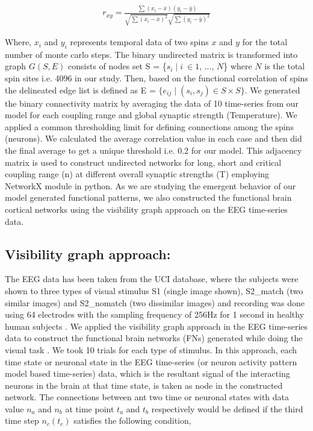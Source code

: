 \documentclass[preprintnumbers,amsmath,amssymb,onecolumn]{revtex4}
\begin{document}
\begin{eqnarray}
r_{xy}=\frac{\sum(x_{i}-\bar{x})(y_{i}-\bar{y})}{\sqrt{\sum(x_{i}-\bar{x})^{2}}\sqrt{\sum(y_{i}-\bar{y})^{2}}}
\end{eqnarray}

Where, $x_{i}$ and $y_{i}$ represents temporal data of two spins $x$ and $y$ for the total number of monte carlo steps. The binary undirected matrix is transformed into graph $G(S,E)$ consists of nodes set S = \{$s_{i}\mid i\:\in1$, ..., $N$\} where $N$ is the total spin sites i.e. 4096 in our study. Then, based on the functional correlation of spins the delineated edge list is defined as E = $\{e_{ij}\mid(s_{i},s_{j})\in S\times S\}$. We generated the binary connectivity matrix by averaging the data of 10 time-series from our model for each coupling range and global synaptic strength (Temperature). We applied a common thresholding limit for defining connections among the spins (neurons). We calculated the average correlation value in each case and then did the final average to get a unique threshold i.e. 0.2 for our model. This adjacency matrix is used to construct undirected networks for long, short and critical coupling range (n) at different overall synaptic strengths (T) employing NetworkX module in python. As we are studying the emergent behavior of our model generated functional patterns, we also constructed the functional brain cortical networks using the visibility graph approach on the EEG time-series data.

\subsection{Visibility graph approach:}

{\noindent}The EEG data has been taken from the UCI database, where the subjects were shown to three types of visual stimulus S1 (single image shown), S2\_match (two similar images) and S2\_nomatch (two dissimilar images) and recording was done using 64 electrodes with the sampling frequency of 256Hz for 1 second in healthy human subjects \citep{Beggs2012}. We applied the visibility graph approach in the EEG time-series data to construct the functional brain networks (FNs) generated while doing the visual task \citep{Lacasa2008}. We took 10 trials for each type of stimulus. In this approach, each time state or neuronal state in the EEG time-series (or neuron activity pattern model based time-series) data, which is the resultant signal of the interacting neurons in the brain at that time state, is taken as node in the constructed network. The connections between ant two time or neuronal states with data value $n_{a}$ and $n_{b}$ at time point $t_{a}$ and $t_{b}$ respectively would be defined if the third time 
step $n_{c}(t_{c})$ satisfies the following condition,
\end{document}
